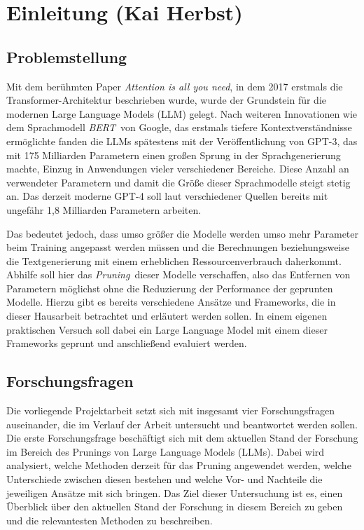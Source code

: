 \section{Einleitung (Kai Herbst)}

\subsection{Problemstellung}

Mit dem berühmten Paper \emph{Attention is all you need}, in dem 2017 erstmals
die Transformer-Architektur beschrieben wurde, wurde der Grundstein für die
modernen Large Language Models (LLM) gelegt.
\autocite[Vlg.][]{vaswani2017attention} Nach weiteren Innovationen wie dem
Sprachmodell \emph{BERT} von Google, das erstmals tiefere Kontextverständnisse
ermöglichte\autocite[Vgl.][]{bertgoogle} fanden die LLMs spätestens mit der
Veröffentlichung von GPT-3, das mit 175 Milliarden Parametern einen großen
Sprung in der Sprachgenerierung machte, Einzug in Anwendungen vieler
verschiedener Bereiche.\autocite[Vgl.][]{gpt3} Diese Anzahl an verwendeter
Parametern und damit die Größe dieser Sprachmodelle steigt stetig an. Das
derzeit moderne GPT-4 soll laut verschiedener Quellen bereits mit ungefähr 1,8
Milliarden Parametern arbeiten.\autocite[Vgl.][]{gpt4size}

Das bedeutet jedoch, dass umso größer die Modelle werden umso mehr Parameter
beim Training angepasst werden müssen und die Berechnungen beziehungsweise die
Textgenerierung mit einem erheblichen Ressourcenverbrauch daherkommt. Abhilfe
soll hier das \emph{Pruning} dieser Modelle verschaffen, also das Entfernen von
Parametern möglichst ohne die Reduzierung der Performance der geprunten
Modelle.\autocite[Vgl.][]{llmpruner} Hierzu gibt es bereits verschiedene Ansätze
und Frameworks, die in dieser Hausarbeit betrachtet und erläutert werden sollen.
In einem eigenen praktischen Versuch soll dabei ein Large Language Model mit
einem dieser Frameworks geprunt und anschließend evaluiert werden.

\subsection{Forschungsfragen}

Die vorliegende Projektarbeit setzt sich mit insgesamt vier Forschungsfragen
auseinander, die im Verlauf der Arbeit untersucht und beantwortet werden sollen.
Die erste Forschungsfrage beschäftigt sich mit dem aktuellen Stand der Forschung
im Bereich des Prunings von Large Language Models (LLMs). Dabei wird analysiert,
welche Methoden derzeit für das Pruning angewendet werden, welche Unterschiede
zwischen diesen bestehen und welche Vor- und Nachteile die jeweiligen Ansätze
mit sich bringen. Das Ziel dieser Untersuchung ist es, einen Überblick über den
aktuellen Stand der Forschung in diesem Bereich zu geben und die relevantesten
Methoden zu beschreiben.


